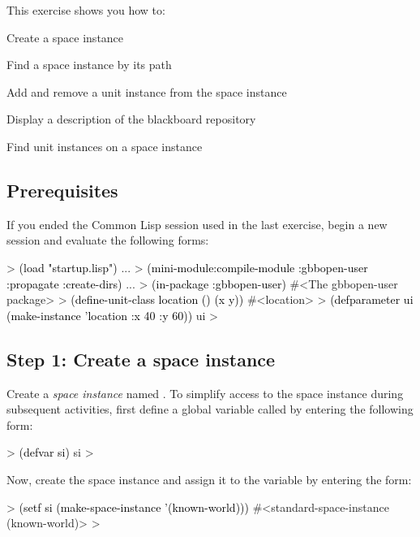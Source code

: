\documentclass[10pt,twoside,english,pdftex]{article}
\begin{document}
\fndocrule

This exercise shows you how to:
\begin{tightitemize}
\item Create a space instance
\item Find a space instance by its path
\item Add and remove a unit instance from the space instance
\item Display a description of the blackboard repository
\item Find unit instances on a space instance
\end{tightitemize}

\fndocrule

\subsection*{Prerequisites}

%
%
%
If you ended the Common Lisp session used in the last exercise, begin a new
session and evaluate the following forms:
%
\begin{example}\color{darkergray}%
 > \textcolor{black}{(load "startup.lisp")}
     ...
  > \textcolor{black}{(mini-module:compile-module :gbbopen-user :propagate :create-dirs)}
     ...
  > \textcolor{black}{(in-package :gbbopen-user)}
  #<The gbbopen-user package>
  > \textcolor{black}{(define-unit-class location ()
      (x y))}
  #<location>
  > \textcolor{black}{(defparameter ui (make-instance 'location :x 40 :y 60))}
  ui
  >
\end{example}

\subsection*{Step 1: Create a space instance}

%
%
Create a \textit{space instance\/} named .  To simplify
access to the space instance during subsequent activities, first define a
global variable called  by entering the following form:
%
\begin{example}\color{darkergray}%
  > \textcolor{black}{(defvar si)}
  si
  >
\end{example}

%
Now, create the space instance and assign it to the variable  by
entering the form:
%
\begin{example}\color{darkergray}%
  > \textcolor{black}{(setf si (make-space-instance '(known-world)))}
  #<standard-space-instance (known-world)>
  >
\end{example}
\end{document}
